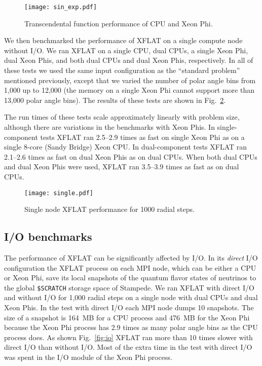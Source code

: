 \documentclass{sig-alternate}
\begin{document}
\begin{figure}
\centering
\texttt{[image: sin\_exp.pdf]}
\caption{Transcendental function performance of CPU and Xeon Phi.}
\label{fig:sin_exp}
\end{figure}



We then benchmarked the performance of XFLAT on a single compute node
without I/O. We ran XFLAT on a single CPU, dual CPUs, a single
Xeon Phi, dual Xeon Phis, and both dual CPUs and dual Xeon Phis, respectively.
In all of these tests we used the same input configuration as the ``standard problem''
mentioned previously, except that we varied the
number of polar angle bins from 1,000 up to 12,000 (the memory on a
single Xeon Phi cannot support more than 13,000 polar
angle bins). The results of these tests are shown in Fig.~\ref{fig:snode}.

The run times of these tests scale approximately linearly with problem size, although there are variations in the benchmarks with
Xeon Phis. In single-component tests XFLAT ran 2.5--2.9 times as 
fast on single Xeon Phi as on a single 8-core (Sandy Bridge) Xeon
CPU. In dual-component tests XFLAT ran 2.1--2.6 times as
fast on dual Xeon Phis as on dual CPUs. When both dual CPUs and dual
Xeon Phis were used, XFLAT ran 3.5--3.9 times as fast as on dual CPUs.

\begin{figure}[t]
\centering
\texttt{[image: single.pdf]}
\caption{Single node XFLAT performance for 1000 radial steps.}
\label{fig:snode}
\end{figure}


\subsection{I/O benchmarks}

The performance of XFLAT can be significantly affected by I/O. 
In its \emph{direct} I/O configuration the XFLAT process on each MPI node,
which can be either a CPU or Xeon Phi,
save its local snapshots of the 
quantum flavor states of neutrinos to the global \texttt{\$SCRATCH}
storage space of Stampede. 
We ran XFLAT with direct I/O and without I/O for
1,000 radial steps on a single node with dual CPUs and dual Xeon
Phis. In the test with direct I/O each MPI node dumps 10
snapshots. The size of a snapshot is 164~MB for a CPU process and 476~MB
for the Xeon Phi because the Xeon Phi process has 2.9 times as many polar
angle bins as the CPU process does. As shown Fig.~\ref{fig:io} XFLAT
ran more than 10 times slower with direct I/O than without I/O.
Most of the extra time in the test with direct I/O was
spent in the I/O module of the Xeon Phi process. 
\end{document}

